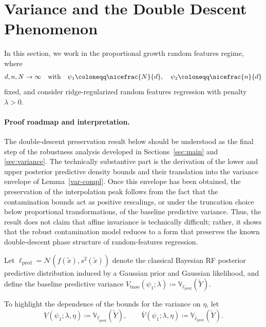 \documentclass[12pt, english, oneside, a4paper]{article}
\begin{document}

\section{Variance and the Double Descent Phenomenon}\label{doub-desc2}
In this section, we work in the proportional growth random features regime, where
\[
d,n,N \to \infty
\quad\text{with}\quad
\psi_1 \coloneqq \nicefrac{N}{d}, \quad    \psi_2 \coloneqq \nicefrac{n}{d}
\]
fixed, and consider ridge-regularized random features regression with penalty $\lambda>0$.

\paragraph{Proof roadmap and interpretation.}
The double-descent preservation result below should be understood as the final step of the robustness analysis developed in Sections~\ref{sec:main} and \ref{sec:variance}. The technically substantive part is the derivation of the lower and upper posterior predictive density bounds and their translation into the variance envelope of Lemma~\ref{var-compl}. Once this envelope has been obtained, the preservation of the interpolation peak follows from the fact that the contamination bounds act as positive rescalings, or under the truncation choice below proportional transformations, of the baseline predictive variance. Thus, the result does not claim that affine invariance is technically difficult; rather, it shows that the robust contamination model reduces to a form that preserves the known double-descent phase structure of random-features regression.

Let $\ell_{\mathrm{pred}}=\mathcal N(\hat f(\tilde x), s^2(\tilde x))$ denote the classical Bayesian RF posterior predictive distribution induced by a Gaussian prior and Gaussian likelihood, and define the baseline predictive variance $V_{\mathrm{base}}(\psi_1;\lambda)
\coloneqq \mathbb{V}_{\ell_{\mathrm{pred}}}(\tilde Y).$

To highlight the dependence of the bounds for the variance on $\eta$, let 
\[
\underline V(\psi_1;\lambda,\eta)
\coloneqq \mathbb{V}_{\underline{\ell}_{\mathrm{pred}}}(\tilde{Y}),
\qquad
\overline V(\psi_1;\lambda,\eta)
\coloneqq \mathbb{V}_{\overline{\ell}_{\mathrm{pred}}}(\tilde{Y}).
\]
\end{document}
